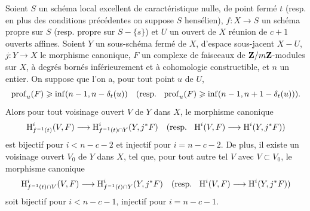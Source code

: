 \begin{proposition} \label{XIV.4.9}
Soient $S$ un sch\'ema local excellent de caract\'eristique nulle, de point ferm\'e $t$ (resp. en plus des conditions pr\'ec\'edentes on suppose $S$ hens\'elien), $f\colon X\to S$ un sch\'ema propre sur $S$ (resp. propre sur $S-\{ s\}$) et $U$ un ouvert de $X$ r\'eunion de $c+1$ ouverts affines. Soient $Y$ un sous-sch\'ema ferm\'e de $X$, d'espace sous-jacent $X-U$, $j\colon Y\to X$ le morphisme canonique, $F$ un complexe de faisceaux de $\mathbf{Z}/m\mathbf{Z}$-modules sur $X$, \`a degr\'es born\'es inf\'erieurement et \`a cohomologie constructible, et $n$ un entier. On suppose que l'on a, pour tout point $u$ de $U$,
$$
\operatorname{prof}_{u}(F)\geqslant\inf(n-1, n-\delta_{t}(u))\quad(\textrm{resp. }\;\operatorname{prof}_{u}(F)\geqslant\inf(n-1, n+1-\delta_{t}(u))).
$$
Alors pour tout voisinage ouvert $V$ de $Y$ dans $X$, le morphisme canonique
$$
\H_{f^{-1}(t)}^{i}(V, F)\to\H_{f^{-1}(t)\cap Y}^{i}(Y, j^{\ast}F)\quad(\textrm{resp. }\;\H^{i}(V, F)\to\H^{i}(Y, j^{\ast}F))$$
est bijectif pour $i<n-c-2$ et injectif pour $i=n-c-2$. De plus, il existe un voisinage ouvert $V_{0}$ de $Y$ dans $X$, tel que, pour tout autre tel $V$ avec $V\subset V_{0}$, le morphisme canonique
$$
\H_{f^{-1}(t)\cap V}^{i}(V, F)\to\H_{f^{-1}(t)\cap Y}^{i}(Y, j^{\ast}F)\quad(\textrm{resp. }\;\H^{i}(V, F)\to\H^{i}(Y, j^{\ast}F))$$
soit bijectif pour $i<n-c-1$, injectif pour $i=n-c-1$.
\end{proposition}


